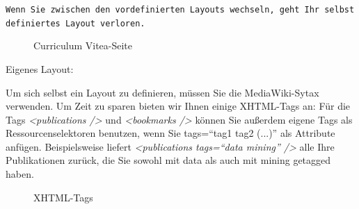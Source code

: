 \begin{mdframed}[style=mdfexample1,frametitle={ACHTUNG},backgroundcolor=gray!40]\texttt{Wenn Sie zwischen den vordefinierten Layouts wechseln, geht Ihr selbst definiertes Layout verloren.} 
\end{mdframed}
\begin{figure}[h!]
 \centering
 \caption{Curriculum Vitea-Seite}
 \label{figure3}
\end{figure}  
\hypertarget{Eigenes Layout}{Eigenes Layout:}
\newline
Um sich selbst ein Layout zu definieren, müssen Sie die MediaWiki-Sytax verwenden. Um Zeit zu sparen bieten wir Ihnen einige XHTML-Tags an: %
\newline
Für die Tags \textit{<publications />} und \textit{<bookmarks />} können Sie außerdem eigene Tags als Ressourcenselektoren benutzen, wenn Sie tags=\enquote{tag1 tag2 (...)} als Attribute anfügen. Beispielsweise liefert \textit{<publications tags=\enquote{data mining} />} alle Ihre Publikationen zurück, die Sie sowohl mit data als auch mit mining getagged haben. 
\begin{figure}[h!]
 \centering
 \caption{XHTML-Tags}
 \label{figure3}
\end{figure}  
